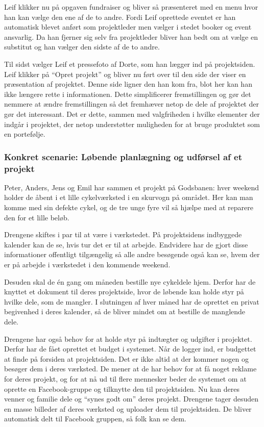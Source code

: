 Leif klikker nu på opgaven fundraiser og bliver så præsenteret med en menu hvor han kan vælge den ene af de to andre. Fordi Leif oprettede eventet er han automatisk blevet anført som projektleder men vælger i stedet booker og event ansvarlig. Da han fjerner sig selv fra projektleder bliver han bedt om at vælge en substitut og han vælger den sidste af de to andre.

Til sidst vælger Leif et pressefoto af Dorte, som han lægger ind på projektsiden. Leif klikker på “Opret projekt” og bliver nu ført over til den side der viser en præsentation af projektet. Denne side ligner den han kom fra, blot her kan han ikke længere rette i informationen. Dette simplificerer fremstillingen og gør det nemmere at ændre fremstillingen så det fremhæver netop de dele af projektet der gør det interessant. Det er dette, sammen med valgfriheden i hvilke elementer der indgår i projektet, der netop understøtter muligheden for at bruge produktet som en portefølje.

\subsubsection{Konkret scenarie: Løbende planlægning og udførsel af et projekt}
Peter, Anders, Jens og Emil har sammen et projekt på Godsbanen: hver weekend holder de åbent i et lille cykelværksted i en skurvogn på området. Her kan man komme med sin defekte cykel, og de tre unge fyre vil så hjælpe med at reparere den for et lille beløb.

Drengene skiftes i par til at være i værkstedet. På projektsidens indbyggede kalender kan de se, hvis tur det er til at arbejde. Endvidere har de gjort disse informationer offentligt tilgængelig så alle andre besøgende også kan se, hvem der er på arbejde i værkstedet i den kommende weekend.

Desuden skal de én gang om måneden bestille nye cykeldele hjem. Derfor har de knyttet et dokument til deres projektside, hvor de løbende kan holde styr på hvilke dele, som de mangler. I slutningen af hver måned har de oprettet en privat begivenhed i deres kalender, så de bliver mindet om at bestille de manglende dele.

Drengene har også behov for at holde styr på indtægter og udgifter i projektet. Derfor har de fået oprettet et budget i systemet. Når de logger ind, er budgettet at finde på forsiden at projektsiden.
Det er ikke altid at der kommer nogen og besøger dem i deres værksted. De mener at de har behov for at få noget reklame for deres projekt, og for at nå ud til flere mennesker beder de systemet om at oprette en Facebook-gruppe og tilknytte den til projektsiden. Nu kan deres venner og familie dele og “synes godt om” deres projekt. Drengene tager desuden en masse billeder af deres værksted og uploader dem til projektsiden. De bliver automatisk delt til Facebook gruppen, så folk kan se dem.


